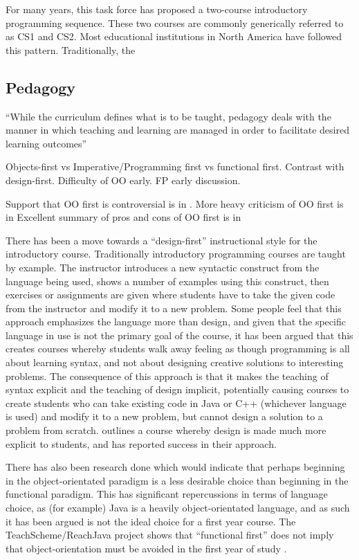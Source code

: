 For many years, this task force has proposed a two-course introductory programming sequence.  These two courses are commonly generically referred to as CS1 and CS2.  Most educational institutions in North America have followed this pattern.
 Traditionally, the

\subsection{Pedagogy}

``While the curriculum defines what is to be taught, pedagogy deals with the manner in which teaching and learning are managed in order to facilitate desired learning outcomes''



Objects-first vs Imperative/Programming first vs functional first.  Contrast with design-first.  Difficulty of OO early.  FP early discussion.

Support that OO first is controversial is in \cite{Astrachan05}.  More heavy criticism of OO first is in \cite{Hu04} Excellent summary of pros and cons of OO first is in \cite{Lister06}

There has been a move towards a ``design-first'' instructional style for the introductory course.  Traditionally introductory programming courses are taught by example.  The instructor introduces a new syntactic construct from the language being used, shows a number of examples using this construct, then exercises or assignments are given where students have to take the given code from the instructor and modify it to a new problem.  Some people feel that this approach emphasizes the language more than design, and given that the specific language in use is not the primary goal of the course, it has been argued that this creates courses whereby students walk away feeling as though programming is all about learning syntax, and not about designing creative solutions to interesting problems.  The consequence of this approach is that it makes the teaching of syntax explicit and the teaching of design implicit, potentially causing courses to create students who can take existing code in Java or C++ (whichever language is used) and modify it to a new problem, but cannot design a solution to a problem from scratch.  \cite{Flatt04} outlines a course whereby design is made much more explicit to students, and has reported success in their approach.

There has also been research done which would indicate that perhaps beginning in the object-orientated paradigm is a less desirable choice than beginning in the functional paradigm\cite{Flatt04,Huch05}.  This has significant repercussions in terms of language choice, as (for example) Java is a heavily object-orientated language, and as such it has been argued is not the ideal choice for a first year course\cite{Bos98,Huch05}.  The TeachScheme/ReachJava project shows that ``functional first'' does not imply that object-orientation must be avoided in the first year of study \cite{Bloch08,teachScheme,Felleisen04}.


